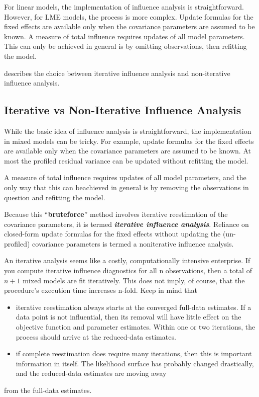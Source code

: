 \documentclass[12pt, a4paper]{article}
\begin{document}
For linear models, the implementation of influence analysis is straightforward.
However, for LME models, the process is more complex. Update formulas for the fixed effects are available only when the covariance parameters are assumed to be known. A measure of total influence requires updates of all model parameters.
This can only be achieved in general is by omitting observations, then refitting the model.

\citet{schabenberger} describes the choice between  iterative influence analysis and  non-iterative influence analysis.

\subsection{Iterative vs Non-Iterative Influence Analysis}
While the basic idea of influence analysis is straightforward, the implementation in mixed models can be tricky. For example, update formulas for the fixed effects are available only when the covariance parameters	are assumed to be known. At most the profiled residual variance can be updated without refitting the model.
	
A measure of total influence requires updates of all model parameters, and the only way that this can beachieved in general is by removing the observations in question and refitting the model. 
	
Because this “\textbf{bruteforce}” method involves iterative reestimation of the covariance parameters, it is termed \textbf{\textit{iterative influence analysis}}. Reliance on closed-form update formulas for the fixed effects without updating the (un-profiled) covariance parameters is termed a noniterative influence analysis.
	
An iterative analysis seems like a costly, computationally intensive enterprise. If you compute iterative influence diagnostics for all n observations, then a total of $n + 1$ mixed models are fit iteratively. This does not imply, of course, that the procedure’s execution time increases n-fold. Keep in mind that

\begin{itemize}
		\item iterative reestimation always starts at the converged full-data estimates. If a data point is not influential,
		then its removal will have little effect on the objective function and parameter estimates. Within
		one or two iterations, the process should arrive at the reduced-data estimates.
		\item if complete reestimation does require many iterations, then this is important information in itself. The
		likelihood surface has probably changed drastically, and the reduced-data estimates are moving away
\end{itemize}
	from the full-data estimates.
			
			
			
		
\end{document}
